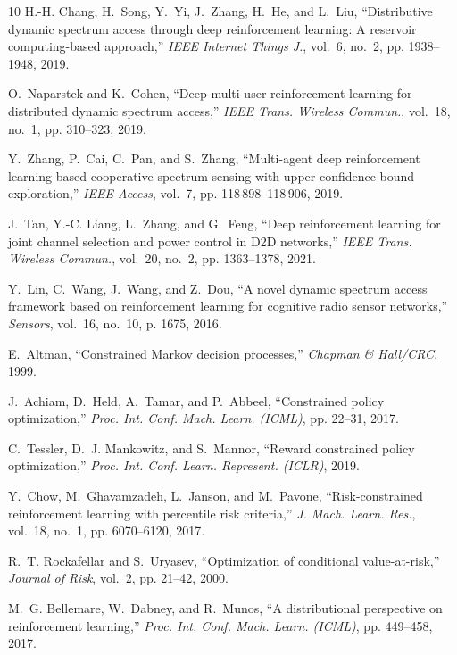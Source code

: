 \documentclass[journal]{IEEEtran}
\begin{document}
{\begin{thebibliography}{10}
H.-H. Chang, H.~Song, Y.~Yi, J.~Zhang, H.~He, and L.~Liu, ``Distributive
  dynamic spectrum access through deep reinforcement learning: A reservoir
  computing-based approach,'' \emph{IEEE Internet Things J.}, vol.~6, no.~2,
  pp. 1938--1948, 2019.

O.~Naparstek and K.~Cohen, ``Deep multi-user reinforcement learning for
  distributed dynamic spectrum access,'' \emph{IEEE Trans. Wireless Commun.},
  vol.~18, no.~1, pp. 310--323, 2019.

Y.~Zhang, P.~Cai, C.~Pan, and S.~Zhang, ``Multi-agent deep reinforcement
  learning-based cooperative spectrum sensing with upper confidence bound
  exploration,'' \emph{IEEE Access}, vol.~7, pp. 118\,898--118\,906, 2019.

J.~Tan, Y.-C. Liang, L.~Zhang, and G.~Feng, ``Deep reinforcement learning for
  joint channel selection and power control in {D2D} networks,'' \emph{IEEE
  Trans. Wireless Commun.}, vol.~20, no.~2, pp. 1363--1378, 2021.

Y.~Lin, C.~Wang, J.~Wang, and Z.~Dou, ``A novel dynamic spectrum access
  framework based on reinforcement learning for cognitive radio sensor
  networks,'' \emph{Sensors}, vol.~16, no.~10, p. 1675, 2016.

E.~Altman, ``Constrained {Markov} decision processes,'' \emph{Chapman \&
  Hall/CRC}, 1999.

J.~Achiam, D.~Held, A.~Tamar, and P.~Abbeel, ``Constrained policy
  optimization,'' \emph{Proc. Int. Conf. Mach. Learn. (ICML)}, pp. 22--31,
  2017.

C.~Tessler, D.~J. Mankowitz, and S.~Mannor, ``Reward constrained policy
  optimization,'' \emph{Proc. Int. Conf. Learn. Represent. (ICLR)}, 2019.

Y.~Chow, M.~Ghavamzadeh, L.~Janson, and M.~Pavone, ``Risk-constrained
  reinforcement learning with percentile risk criteria,'' \emph{J. Mach. Learn.
  Res.}, vol.~18, no.~1, pp. 6070--6120, 2017.

R.~T. Rockafellar and S.~Uryasev, ``Optimization of conditional
  value-at-risk,'' \emph{Journal of Risk}, vol.~2, pp. 21--42, 2000.

M.~G. Bellemare, W.~Dabney, and R.~Munos, ``A distributional perspective on
  reinforcement learning,'' \emph{Proc. Int. Conf. Mach. Learn. (ICML)}, pp.
  449--458, 2017.


\end{thebibliography}}
\end{document}

